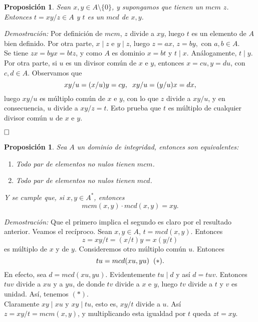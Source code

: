 \documentclass[12pt]{article}
\newtheorem{proposition}[theorem]{Proposición}
\begin{document}
\begin{proposition} \label{eq:lemdiv} Sean $x, y \in A\setminus \lbrace 0 \rbrace$, y supongamos que tienen un $mcm$ $z$. Entonces $t = xy/z \in A$ y $t$ es un $mcd$ de $x,y$.
\end{proposition}
\emph{Demostración: } Por definición de $mcm$, $z$ divide a $xy$, luego $t$ es un elemento de $A$ bien definido. Por otra parte, $x \mid z$ e $y\mid z$, luego $z = ax$, $z =by,$ con $a,b \in A.$ \vspace{0.2cm}\\
Se tiene $zx =byx = btz$, y como $A$ es dominio $x = bt$ y $t \mid x$. Análogamente, $t \mid y$. Por otra parte, si $u$ es un divisor común de $x$ e $y$, entonces $x = cu, y = du$, con $c,d \in A$. Observamos que  $$xy/u = (x/u)y = cy, \hspace{0.2cm} xy/u = (y/u)x = dx,$$ luego $xy/u$ es múltiplo común de $x$ e $y$, con lo que $z$ divide a $xy/u$, y en consecuencia, $u$ divide a $xy/z = t$. Esto prueba que $t$ es múltiplo de cualquier divisor común $u$ de $x$ e $y$.

$\hfill \square$

\begin{proposition} \label{eq:mcmd} Sea $A$ un dominio de integridad, entonces son equivalentes:
\begin{enumerate}
\item Todo par de elementos no nulos tienen $mcm$.
\item Todo par de elementos no nulos tienen $mcd$.
\end{enumerate}
Y se cumple que, si $x,y \in A^{\ast}$, entonces $$mcm(x,y) \cdot mcd(x,y) = xy.$$
\end{proposition}
\emph{Demostración: } Que el primero implica el segundo es claro por el resultado anterior. Veamos el recíproco. Sean $x,y \in A$, $t = mcd(x,y)$. Entonces $$z = xy/t = (x/t)y = x(y/t)$$ es múltiplo de $x$ y de $y$. Consideremos otro múltiplo común $u$. Entonces $$tu = mcd(xu,yu) \hspace{0.2cm} (\ast).$$ En efecto, sea $d = mcd(xu,yu)$. Evidentemente $tu \mid d$ y así $d = tuv$. Entonces $tuv$ divide a $xu$ y a $yu$, de donde $tv$ divide a $x$ e $y$, luego $tv$ divide a $t$ y $v$ es unidad. Así, tenemos $(\ast)$.\vspace{0.2cm}\\
Claramente $xy \mid xu$ y $xy \mid tu$, esto es, $xy / t$ divide a $u$. Así $z = xy/t = mcm(x,y)$, y multiplicando esta igualdad por $t$ queda $zt = xy$.
\end{document}
